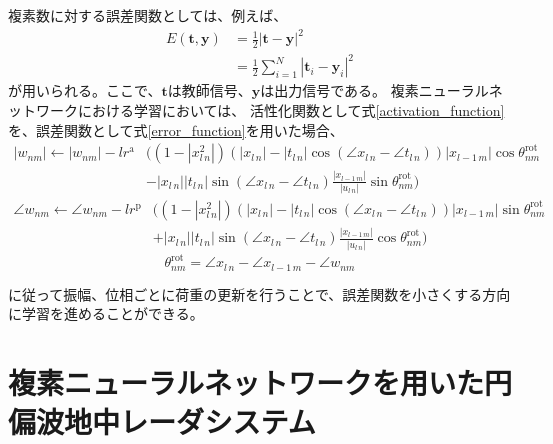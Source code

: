 \documentclass[11pt,a4paper,uplatex]{ujarticle}
\begin{document}
    複素数に対する誤差関数としては、例えば、
    \begin{equation}\label{error_function}
      \begin{split}
      E(\bm{t}, \bm{y})  & = \frac{1}{2}|\bm{t} - \bm{y}|^2\\
      & = \frac{1}{2}\sum_{i=1}^{N}|\bm{t}_i - \bm{y}_i|^2
      \end{split}
    \end{equation}
    が用いられる。ここで、$\bm{t}$は教師信号、$\bm{y}$は出力信号である。
    複素ニューラルネットワークにおける学習においては、
    活性化関数として式\ref{activation_function}を、誤差関数として式\ref{error_function}を用いた場合、
    \begin{equation}
      \label{eq:update_a}
      \begin{split}
        |w_{nm}| \leftarrow |w_{nm}| - lr^\mathrm{a} & \biggl( (1-|x_{l\,n}^2|)(|x_{l\, n}| - |t_{l\, n}| \cos (\angle x_{l\, n} - \angle t_{l\, n}))|x_{l-1\, m}| \cos \theta^{\mathrm{rot}}_{nm}  \\
                        & - |x_{l\, n}| |t_{l\, n}| \sin (\angle x_{l\, n} - \angle t_{l\, n}) \frac{|x_{l-1\, m}|}{|u_{l\, n}|} \sin \theta^{\mathrm{rot}}_{nm} \biggr)
      \end{split}
    \end{equation}
    \begin{equation}
      \label{eq:update_p}
      \begin{split}
        \angle w_{nm} \leftarrow \angle w_{nm} - lr^\mathrm{p} & \bigg( (1-|x_{l\,n}^2|)(|x_{l\, n}| - |t_{l\, n}| \cos (\angle x_{l\, n} - \angle t_{l\, n}))|x_{l-1\, m}| \sin \theta^{\mathrm{rot}}_{nm} \\
                        &  + |x_{l\, n}| |t_{l\, n}| \sin (\angle x_{l\, n} - \angle t_{l\, n}) \frac{|x_{l-1\, m}|}{|u_{l\, n}|} \cos \theta^{\mathrm{rot}}_{nm} \bigg)
      \end{split}
    \end{equation}
    \begin{equation}
      \label{eq:rot}
        \theta^{\mathrm{rot}}_{nm} = \angle x_{l\, n} - \angle x_{l-1\, m} -\angle w_{nm}
    \end{equation}

    に従って振幅、位相ごとに荷重の更新を行うことで、誤差関数を小さくする方向に学習を進めることができる。\cite{CVNN}

\section{複素ニューラルネットワークを用いた円偏波地中レーダシステム}
\end{document}
